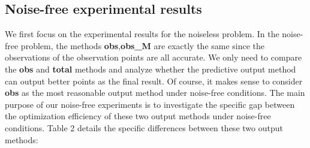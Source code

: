 \documentclass{article}
\begin{document}
  \subsection{Noise-free experimental results}
  \hspace{2em}We first focus on the experimental results for the noiseless problem. In the noise-free problem, the methods \textbf{obs},\textbf{obs\_M} are exactly the same since the observations of the observation points are all accurate. We only need to compare the \textbf{obs} and \textbf{total} methods and analyze whether the predictive output method can output better points as the final result. Of course, it makes sense to consider \textbf{obs} as the most reasonable output method under noise-free conditions. The main purpose of our noise-free experiments is to investigate the specific gap between the optimization efficiency of these two output methods under noise-free conditions. Table 2 details the specific differences between these two output methods:
\end{document}
